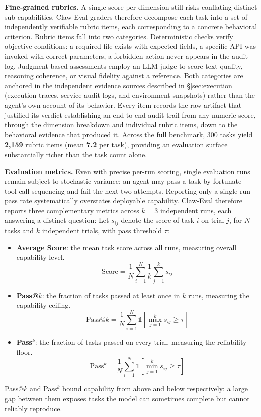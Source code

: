 \documentclass{article}
\begin{document}
\textbf{Fine-grained rubrics.} A single score per dimension still risks conflating distinct sub-capabilities. Claw-Eval graders therefore decompose each task into a set of independently verifiable rubric items, each corresponding to a concrete behavioral criterion. Rubric items fall into two categories. Deterministic checks verify objective conditions: a required file exists with expected fields, a specific API was invoked with correct parameters, a forbidden action never appears in the audit log. Judgment-based assessments employ an LLM judge to score text quality, reasoning coherence, or visual fidelity against a reference. Both categories are anchored in the independent evidence sources described in \S\ref{sec:execution} (execution traces, service audit logs, and environment snapshots) rather than the agent's own account of its behavior. Every item records the raw artifact that justified its verdict establishing an end-to-end audit trail from any numeric score, through the dimension breakdown and individual rubric items, down to the behavioral evidence that produced it. Across the full benchmark, 300 tasks yield \textbf{2,159} rubric items
  (mean \textbf{7.2} per task),
  providing an
  evaluation surface substantially richer than the task
  count alone.

\textbf{Evaluation metrics.} Even with precise per-run scoring, single evaluation runs remain subject to stochastic variance: an agent may pass a task by fortunate tool-call sequencing and fail the next two attempts. Reporting only a single-run pass rate systematically overstates deployable capability. Claw-Eval therefore reports three complementary metrics across $k{=}3$ independent runs, each answering a distinct question:
Let $s_{ij}$ denote the score of task $i$ on trial $j$, for $N$ tasks and $k$ independent trials, with pass threshold $\tau$:
\begin{itemize}
  \item \textbf{Average Score}: the mean task score across all runs, measuring overall capability level.
  $$\text{Score} = \frac{1}{N}\sum_{i=1}^{N}\frac{1}{k}\sum_{j=1}^{k} s_{ij}$$
  \item \textbf{Pass@$k$}: the fraction of tasks passed at least once in $k$ runs, measuring the capability ceiling.
  $$\text{Pass@}k = \frac{1}{N}\sum_{i=1}^{N} \mathds{1} \left[\max_{j=1}^{k} s_{ij} \geq \tau\right]$$
  \item \textbf{Pass$^k$}: the fraction of tasks passed on every trial, measuring the reliability floor.
  $$\text{Pass}^k = \frac{1}{N}\sum_{i=1}^{N} \mathds{1} \left[\min_{j=1}^{k} s_{ij} \geq \tau\right]$$
\end{itemize}
Pass@$k$ and Pass$^k$ bound capability from above and below respectively: a large gap between them exposes tasks the model can sometimes complete but cannot reliably reproduce.
\end{document}
